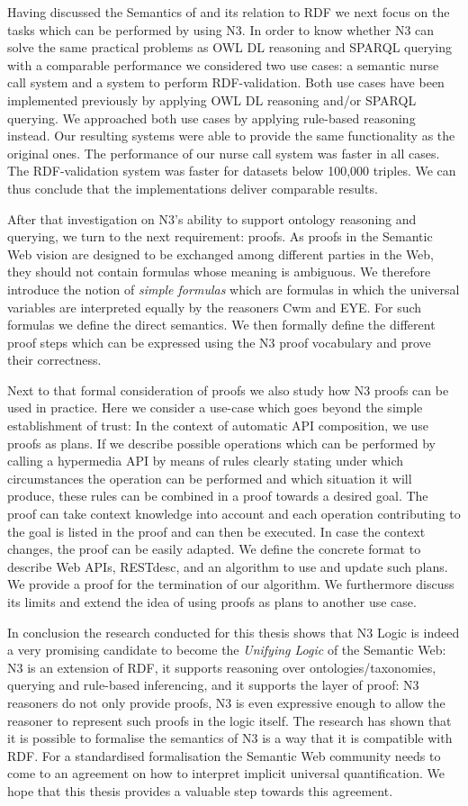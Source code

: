 Having discussed the Semantics of \nthree and its relation to RDF we next focus on the tasks which can be performed by using N3. In order to know 
whether N3 can solve the same practical problems as OWL DL reasoning and SPARQL querying with a comparable performance we considered two use cases: a semantic nurse call 
system and a system to perform RDF-validation. Both use cases have been implemented previously by applying OWL DL reasoning and/or SPARQL querying.
We approached both use cases by applying rule-based reasoning instead. Our resulting systems were able to provide the same functionality as the original ones.
The performance of our nurse call system was faster in all cases.  
The RDF-validation system was faster for datasets below 100,000 triples. We can thus conclude that the implementations deliver comparable results.

After that investigation on N3's ability to support ontology reasoning and querying, we turn to the next requirement: proofs. 
As proofs in the Semantic Web vision are designed to be exchanged among different parties in the Web, they should not contain formulas whose meaning is ambiguous.
We therefore introduce the notion of \emph{simple formulas} which are formulas in which the universal variables are interpreted equally by the reasoners Cwm and EYE. 
For such formulas we define the direct semantics. We then formally define the different proof steps which can be expressed 
using the N3 proof vocabulary and prove their correctness.

Next to that formal consideration of proofs we also study how N3 proofs can be used in practice. Here we consider a use-case which goes beyond the simple establishment of trust:
In the context of automatic API composition, we use proofs as plans. If we describe possible operations
which can be performed by calling a hypermedia API by means of rules clearly stating under which circumstances 
 the operation can be performed and which situation it will produce, these rules can be combined in a proof towards a desired goal.
The proof can take context knowledge into account and each operation contributing to the goal is listed in the proof and can then be executed. In case the context changes,
the proof can be easily adapted. We define the concrete format to describe Web APIs, RESTdesc, and an algorithm to use and update such plans. We provide a proof for 
the termination of our algorithm. We furthermore discuss its limits and extend the idea of using proofs as plans to another use case.

In conclusion the research conducted for this thesis shows that N3 Logic is indeed a very promising candidate to become the \emph{Unifying Logic} of the Semantic Web:
N3 is an extension of RDF, it supports reasoning over ontologies/taxonomies, querying and rule-based inferencing, and it supports the layer
of proof: N3 reasoners do not only provide proofs, N3 is even expressive enough to allow the reasoner to represent such proofs in the logic itself. 
The research has shown that it is possible 
to formalise the semantics of N3 is a way that it is compatible with RDF. For a standardised formalisation the Semantic Web community needs to 
come to an agreement on how to interpret implicit universal quantification. We hope that this thesis provides a valuable step towards this agreement.
